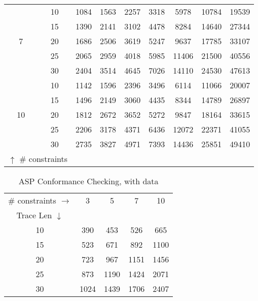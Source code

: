 \begin{table}[]
{\begin{tabular}{|c|c|ccccccc|}
\hline
\hline
\multirow{5}{*}{7}&10                                                           & 1084 & 1563 & 2257 & 3318 & 5978 & 10784 & 19539  \\
&15                                                           & 1390 & 2141 & 3102 & 4478 & 8284 & 14640 & 27344  \\
&20                                                           & 1686 & 2506 & 3619 & 5247 & 9637 & 17785 & 33107  \\
&25                                                           & 2065 & 2959 & 4018 & 5985 & 11406 & 21500 & 40556  \\
&30                                                           & 2404 & 3514 & 4645 & 7026 & 14110 & 24530 & 47613  \\
\hline
\hline
\multirow{5}{*}{10}&10                                                           & 1142 & 1596 & 2396 & 3496 & 6114 & 11066 & 20007  \\
&15                                                           & 1496 & 2149 & 3060 & 4435 & 8344 & 14789 & 26897  \\
&20                                                           & 1812 & 2672 & 3652 & 5272 & 9847 & 18164 & 33615  \\
&25                                                           & 2206 & 3178 & 4371 & 6436 & 12072 & 22371 & 41055  \\
&30                                                           & 2735 & 3827 & 4971 & 7393 & 14436 & 25851 & 49410  \\
\hline
\multicolumn{2}{|c}{ $\uparrow$ \# constraints}  &  &  &  &  &  &  &   \\
\hline\end{tabular}
}
\end{table}


\begin{table}
\centering
\caption{ASP Conformance Checking, with data}
\label{tab:aspCCWData}
\begin{tabular}{|c|cccc|}
\hline
\# constraints $\rightarrow$ & 3 & 5 & 7 & 10 \\
\cline{1-1}
Trace Len  $\downarrow$      &   &   &   &   \\
\hline
10 & 	390 & 453 & 526 & 665 \\
15 & 	523 & 671 & 892 & 1100 \\
20 & 	723 & 967 & 1151 & 1456 \\
25 & 	873 & 1190 & 1424 & 2071 \\
30 & 	1024 & 1439 & 1706 & 2407 \\
\hline
\end{tabular}
\end{table}

